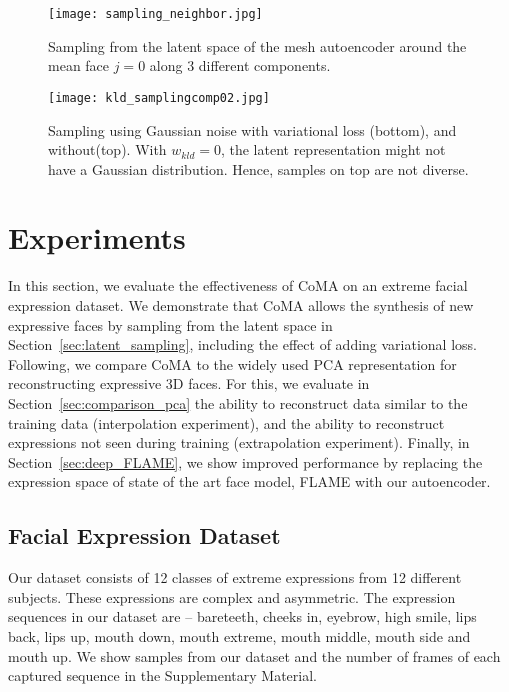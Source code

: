 \begin{figure}[t]
\begin{center}
\texttt{[image: sampling\_neighbor.jpg]}
\end{center}
\caption{Sampling from the latent space of the mesh autoencoder around the mean face $j=0$ along 3 different components.}
\label{fig:latent_space}
\end{figure}

\begin{figure}[t]
\begin{center}
\texttt{[image: kld\_samplingcomp02.jpg]}
\end{center}
\caption{Sampling using Gaussian noise with variational loss (bottom), and without(top). With $w_{kld}=0$, the latent representation might not have a Gaussian distribution. Hence, samples on top are not diverse.}
\label{fig:vae}
\end{figure}

\section{Experiments}
In this section, we evaluate the effectiveness of CoMA on an extreme facial expression dataset. We demonstrate that CoMA allows the synthesis of new expressive faces by sampling from the latent space in Section~\ref{sec:latent_sampling}, including the effect of adding variational loss. Following, we compare CoMA to the widely used PCA representation for reconstructing expressive 3D faces. For this, we evaluate in Section~\ref{sec:comparison_pca} the ability to reconstruct data similar to the training data (interpolation experiment), and the ability to reconstruct expressions not seen during training (extrapolation experiment). Finally, in Section~\ref{sec:deep_FLAME}, we show improved performance by replacing the expression space of state of the art face model, FLAME \cite{FLAME2017} with our autoencoder.


\subsection{Facial Expression Dataset}
Our dataset consists of 12 classes of extreme expressions from 12 different subjects. These expressions are complex and asymmetric. The expression sequences in our dataset are -- bareteeth, cheeks in, eyebrow, high smile, lips back, lips up, mouth down, mouth extreme, mouth middle, mouth side and mouth up. We show samples from our dataset and the number of frames of each captured sequence in the Supplementary Material.

